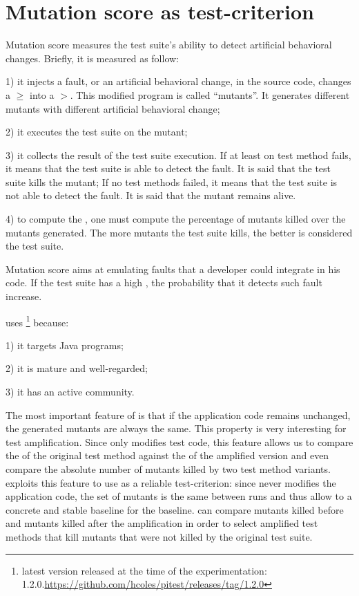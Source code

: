 \section{Mutation score as test-criterion}
\label{sec:test-improvement:mutation-score}

Mutation score measures the test suite's ability to detect artificial behavioral changes.
Briefly, it is measured as follow:

1) it injects a fault, or an artificial behavioral change, in the source code, \eg changes a $\ge$ into a $>$.
This modified program is called ``mutants''.
It generates different mutants with different artificial behavioral change;

2) it executes the test suite on the mutant;

3) it collects the result of the test suite execution.
If at least on test method fails, it means that the test suite is able to detect the fault.
It is said that the test suite kills the mutant;
If no test methods failed, it means that the test suite is not able to detect the fault. 
It is said that the mutant remains alive.

4) to compute the \ms, one must compute the percentage of mutants killed over the mutants generated.
The more mutants the test suite kills, the better is considered the test suite.

Mutation score aims at emulating faults that a developer could integrate in his code.
If the test suite has a high \ms, the probability that it detects such fault increase.

\dspot uses \pitest\cite{coles_pit_2016} \footnote{latest version released at the time of the experimentation: 1.2.0.\url{https://github.com/hcoles/pitest/releases/tag/1.2.0}} because: 

1) it targets Java programs;

2) it is mature and well-regarded;

3) it has an active community.

The most important feature of \pitest is that if the application code remains unchanged, the generated mutants are always the same.
This property is very interesting for test amplification.
Since \dspot only modifies test code, this feature allows us to compare the \ms of the original test method against the \ms of the amplified version and even compare the absolute number of mutants killed by two test method variants. 
\dspot exploits this feature to use \ms as a reliable test-criterion:
since \dspot never modifies the application code, the set of mutants is the same between runs and thus allow \dspot to a concrete and stable baseline for the baseline.
\dspot can compare mutants killed before and mutants killed after the amplification in order to select amplified test methods that kill mutants that were not killed by the original test suite.

